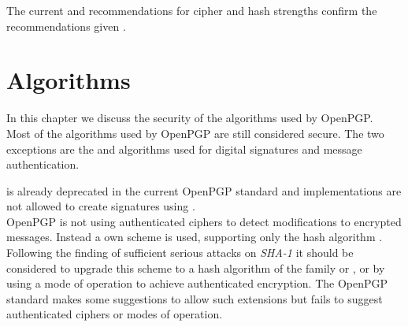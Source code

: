 The current  and  recommendations for cipher and hash strengths confirm the recommendations given \cite{keylenNIST} \cite{KeylenBSI}. 

\section{Algorithms}

In this chapter we discuss the security of the algorithms used by OpenPGP.  \\




Most of the algorithms used by OpenPGP are still considered secure. 
The two exceptions are the  \citep{XieLF13} and  \citep{stevens2012attacks} algorithms used for digital signatures and message authentication. 

 is already deprecated in the current OpenPGP standard \citep[section 14]{RFC4880} and implementations are not allowed to create signatures using .   \\

OpenPGP is not using authenticated ciphers to detect modifications to encrypted messages.
Instead a own scheme is used, supporting only the  hash algorithm \citep[section 5.13]{RFC4880}. 
Following the finding of sufficient serious attacks on \textit{SHA-1} \cite{stevens2012attacks} it should be considered to upgrade this scheme to a hash algorithm of the  family or , or by using a mode of operation to achieve authenticated encryption. The OpenPGP standard makes some suggestions to allow such extensions \citep[section 13.11]{RFC4880} but fails to suggest authenticated ciphers or modes of operation.




